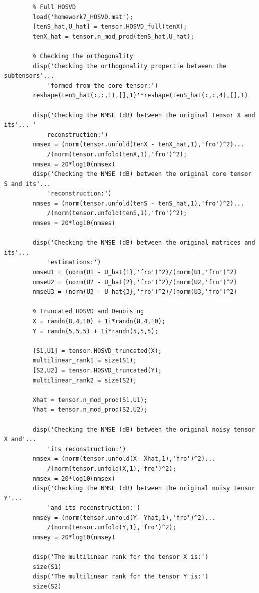 \documentclass[a4paper,10pt]{article}
\begin{document}
\begin{verbatim}
        % Full HOSVD
        load('homework7_HOSVD.mat');
        [tenS_hat,U_hat] = tensor.HOSVD_full(tenX);
        tenX_hat = tensor.n_mod_prod(tenS_hat,U_hat);

        % Checking the orthogonality
        disp('Checking the orthogonality propertie between the subtensors'...
            'formed from the core tensor:')
        reshape(tenS_hat(:,:,1),[],1)'*reshape(tenS_hat(:,:,4),[],1)

        disp('Checking the NMSE (dB) between the original tensor X and its'... '
            reconstruction:')
        nmsex = (norm(tensor.unfold(tenX - tenX_hat,1),'fro')^2)...
            /(norm(tensor.unfold(tenX,1),'fro')^2);
        nmsex = 20*log10(nmsex)
        disp('Checking the NMSE (dB) between the original core tensor S and its'... 
            'reconstruction:')
        nmses = (norm(tensor.unfold(tenS - tenS_hat,1),'fro')^2)...
            /(norm(tensor.unfold(tenS,1),'fro')^2);
        nmses = 20*log10(nmses)

        disp('Checking the NMSE (dB) between the original matrices and its'... 
            'estimations:')
        nmseU1 = (norm(U1 - U_hat{1},'fro')^2)/(norm(U1,'fro')^2)
        nmseU2 = (norm(U2 - U_hat{2},'fro')^2)/(norm(U2,'fro')^2)
        nmseU3 = (norm(U3 - U_hat{3},'fro')^2)/(norm(U3,'fro')^2)

        % Truncated HOSVD and Denoising
        X = randn(8,4,10) + 1i*randn(8,4,10);
        Y = randn(5,5,5) + 1i*randn(5,5,5);

        [S1,U1] = tensor.HOSVD_truncated(X);
        multilinear_rank1 = size(S1);
        [S2,U2] = tensor.HOSVD_truncated(Y);
        multilinear_rank2 = size(S2);

        Xhat = tensor.n_mod_prod(S1,U1);
        Yhat = tensor.n_mod_prod(S2,U2);

        disp('Checking the NMSE (dB) between the original noisy tensor X and'... 
            'its reconstruction:')
        nmsex = (norm(tensor.unfold(X- Xhat,1),'fro')^2)...
            /(norm(tensor.unfold(X,1),'fro')^2);
        nmsex = 20*log10(nmsex)
        disp('Checking the NMSE (dB) between the original noisy tensor Y'...
            'and its reconstruction:')
        nmsey = (norm(tensor.unfold(Y- Yhat,1),'fro')^2)...
            /(norm(tensor.unfold(Y,1),'fro')^2);
        nmsey = 20*log10(nmsey)

        disp('The multilinear rank for the tensor X is:')
        size(S1)
        disp('The multilinear rank for the tensor Y is:')
        size(S2)
    \end{verbatim}
    
\end{document}
